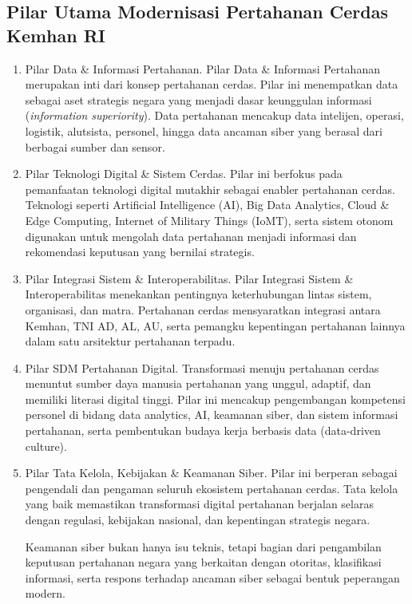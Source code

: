 \subsection{Pilar Utama Modernisasi Pertahanan Cerdas Kemhan RI}
\begin{enumerate}
  \item Pilar Data \& Informasi Pertahanan.
  Pilar Data \& Informasi Pertahanan merupakan inti dari konsep pertahanan cerdas.
  Pilar ini menempatkan data sebagai aset strategis negara yang menjadi dasar keunggulan informasi (\textit{information superiority}).
  Data pertahanan mencakup data intelijen, operasi, logistik, alutsista, personel, hingga data ancaman siber yang berasal dari berbagai sumber dan sensor.
  \item Pilar Teknologi Digital \& Sistem Cerdas.
  Pilar ini berfokus pada pemanfaatan teknologi digital mutakhir sebagai enabler pertahanan cerdas.
  Teknologi seperti Artificial Intelligence (AI), Big Data Analytics, Cloud \& Edge Computing, Internet of Military Things (IoMT), serta sistem otonom digunakan untuk mengolah data pertahanan menjadi informasi dan rekomendasi keputusan yang bernilai strategis.
  \item Pilar Integrasi Sistem \& Interoperabilitas.
  Pilar Integrasi Sistem \& Interoperabilitas menekankan pentingnya keterhubungan lintas sistem, organisasi, dan matra.
  Pertahanan cerdas mensyaratkan integrasi antara Kemhan, TNI AD, AL, AU, serta pemangku kepentingan pertahanan lainnya dalam satu arsitektur pertahanan terpadu.
  \item Pilar SDM Pertahanan Digital.
  Transformasi menuju pertahanan cerdas menuntut sumber daya manusia pertahanan yang unggul, adaptif, dan memiliki literasi digital tinggi.
  Pilar ini mencakup pengembangan kompetensi personel di bidang data analytics, AI, keamanan siber, dan sistem informasi pertahanan, serta pembentukan budaya kerja berbasis data (data-driven culture).
  \item Pilar Tata Kelola, Kebijakan \& Keamanan Siber.
  Pilar ini berperan sebagai pengendali dan pengaman seluruh ekosistem pertahanan cerdas.
  Tata kelola yang baik memastikan transformasi digital pertahanan berjalan selaras dengan regulasi, kebijakan nasional, dan kepentingan strategis negara.

  Keamanan siber bukan hanya isu teknis, tetapi bagian dari pengambilan keputusan pertahanan negara yang berkaitan dengan otoritas, klasifikasi informasi, serta respons terhadap ancaman siber sebagai bentuk peperangan modern.


\end{enumerate}
